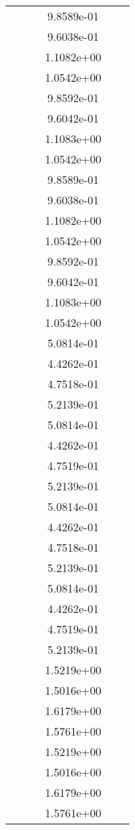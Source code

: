 \begin{xltabular}{\textwidth}{r|rS[table-format=1.3e+2]S[table-format=1.4e+2]S[table-format=1.4e+2]S[table-format=-1.5]}
&  &  & 9.8589e-01 & & \\
&  &  & 9.6038e-01 & & \\
&  &  & 1.1082e+00 & & \\
&  &  & 1.0542e+00 & & \\
&  &  & 9.8592e-01 & & \\
&  &  & 9.6042e-01 & & \\
&  &  & 1.1083e+00 & & \\
&  &  & 1.0542e+00 & & \\
&  &  & 9.8589e-01 & & \\
&  &  & 9.6038e-01 & & \\
&  &  & 1.1082e+00 & & \\
&  &  & 1.0542e+00 & & \\
&  &  & 9.8592e-01 & & \\
&  &  & 9.6042e-01 & & \\
&  &  & 1.1083e+00 & & \\
&  &  & 1.0542e+00 & & \\
&  &  & 5.0814e-01 & & \\
&  &  & 4.4262e-01 & & \\
&  &  & 4.7518e-01 & & \\
&  &  & 5.2139e-01 & & \\
&  &  & 5.0814e-01 & & \\
&  &  & 4.4262e-01 & & \\
&  &  & 4.7519e-01 & & \\
&  &  & 5.2139e-01 & & \\
&  &  & 5.0814e-01 & & \\
&  &  & 4.4262e-01 & & \\
&  &  & 4.7518e-01 & & \\
&  &  & 5.2139e-01 & & \\
&  &  & 5.0814e-01 & & \\
&  &  & 4.4262e-01 & & \\
&  &  & 4.7519e-01 & & \\
&  &  & 5.2139e-01 & & \\
&  &  & 1.5219e+00 & & \\
&  &  & 1.5016e+00 & & \\
&  &  & 1.6179e+00 & & \\
&  &  & 1.5761e+00 & & \\
&  &  & 1.5219e+00 & & \\
&  &  & 1.5016e+00 & & \\
&  &  & 1.6179e+00 & & \\
&  &  & 1.5761e+00 & & \\

\end{xltabular}
